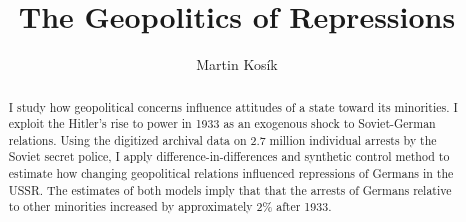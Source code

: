 
\title{The Geopolitics of Repressions}
\author{Martin Kosík}



\maketitle

\begin{abstract}
  I study how geopolitical concerns influence attitudes of a state toward its minorities. I exploit the  Hitler's rise to power in 1933 as an exogenous shock to Soviet-German relations. 
    Using the digitized archival data on 2.7 million individual arrests by the Soviet secret police, I apply difference-in-differences and synthetic control method to estimate how changing geopolitical relations influenced repressions of Germans in the USSR. The estimates of both models imply that that the arrests of Germans relative to other minorities increased by approximately 2\% after 1933. 
\end{abstract}

\newpage
 \tableofcontents
\newpage
{}

